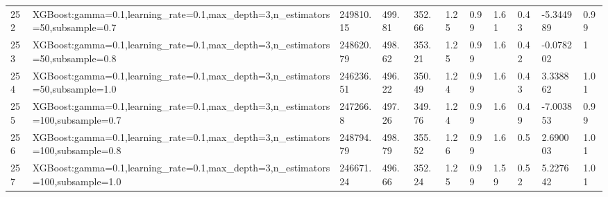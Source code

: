 \begin{longtable}{C{0.8cm} L{2cm} C{1.15cm} C{1.15cm} C{1.15cm} C{1.15cm} C{0.85cm} C{1.25cm} C{1.2cm} C{1.5cm} C{1.0cm}}
252 & XGBoost:\newline gamma=0.1,\newline learning\_rate=0.1,\newline max\_depth=3,\newline n\_estimators=50,\newline subsample=0.7 & 249810.15 & 499.81 & 352.66 & 1.25 & 0.99 & 1.61 & 0.43 & -5.344989 & 0.99 \\
253 & XGBoost:\newline gamma=0.1,\newline learning\_rate=0.1,\newline max\_depth=3,\newline n\_estimators=50,\newline subsample=0.8 & 248620.79 & 498.62 & 353.21 & 1.25 & 0.99 & 1.6 & 0.42 & -0.078202 & 1 \\
254 & XGBoost:\newline gamma=0.1,\newline learning\_rate=0.1,\newline max\_depth=3,\newline n\_estimators=50,\newline subsample=1.0 & 246236.51 & 496.22 & 350.49 & 1.24 & 0.99 & 1.6 & 0.43 & 3.338862 & 1.01 \\
255 & XGBoost:\newline gamma=0.1,\newline learning\_rate=0.1,\newline max\_depth=3,\newline n\_estimators=100,\newline subsample=0.7 & 247266.8 & 497.26 & 349.76 & 1.24 & 0.99 & 1.6 & 0.49 & -7.003853 & 0.99 \\
256 & XGBoost:\newline gamma=0.1,\newline learning\_rate=0.1,\newline max\_depth=3,\newline n\_estimators=100,\newline subsample=0.8 & 248794.79 & 498.79 & 355.52 & 1.26 & 0.99 & 1.6 & 0.5 & 2.690003 & 1.01 \\
257 & XGBoost:\newline gamma=0.1,\newline learning\_rate=0.1,\newline max\_depth=3,\newline n\_estimators=100,\newline subsample=1.0 & 246671.24 & 496.66 & 352.24 & 1.25 & 0.99 & 1.59 & 0.52 & 5.227642 & 1.01 \\

\end{longtable}
